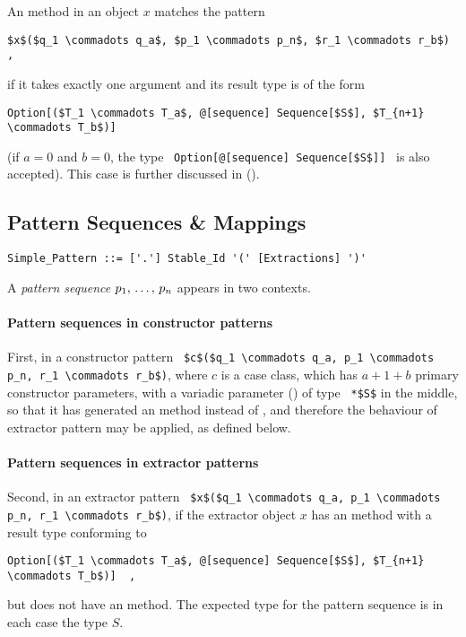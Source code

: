 An  method in an object $x$ matches the pattern 
\begin{lstlisting}
$x$($q_1 \commadots q_a$, $p_1 \commadots p_n$, $r_1 \commadots r_b$)  ,
\end{lstlisting}
if it takes exactly one argument and its result type is of the form 
\begin{lstlisting}
Option[($T_1 \commadots T_a$, @[sequence] Sequence[$S$], $T_{n+1} \commadots T_b$)]
\end{lstlisting}
(if $a = 0$ and $b = 0$, the type ~\lstinline!Option[@[sequence] Sequence[$S$]]!~ is also accepted). This case is further discussed in ().





\subsection{Pattern Sequences \& Mappings}
\label{sec:pattern-sequences}

\syntax\begin{lstlisting}
Simple_Pattern ::= ['.'] Stable_Id '(' [Extractions] ')'
\end{lstlisting}

A {\em pattern sequence} $p_1 ,\, \ldots ,\, p_n$ appears in two contexts. 

\paragraph{Pattern sequences in constructor patterns}
First, in a constructor pattern ~\lstinline!$c$($q_1 \commadots q_a, p_1 \commadots p_n, r_1 \commadots r_b$)!, where $c$ is a case class, which has $a+1+b$ primary constructor parameters, with a variadic parameter () of type ~\lstinline!*$S$! in the middle, so that it has generated an  method instead of , and therefore the behaviour of extractor pattern may be applied, as defined below. 

\paragraph{Pattern sequences in extractor patterns}
Second, in an extractor pattern ~\lstinline!$x$($q_1 \commadots q_a, p_1 \commadots p_n, r_1 \commadots r_b$)!, if the extractor object $x$ has an  method with a result type conforming to
\begin{lstlisting}
Option[($T_1 \commadots T_a$, @[sequence] Sequence[$S$], $T_{n+1} \commadots T_b$)]  ,
\end{lstlisting}
but does not have an  method. The expected type for the pattern sequence is in each case the type $S$. 

